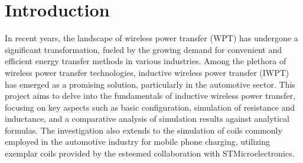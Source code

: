 \documentclass[11pt,a4paper,twoside,openany]{report}
\newcommand\declarationpage{}
\newcommand\acknowledgementspage{}
\newcommand\abstractpage{}
\begin{document}
    
    \begin{titlepage}
        
    \end{titlepage}

    \newpage\blankpage








    \tableofcontents

    \chapter*{Introduction}
    \label{chap:introduction}
    
    In recent years, the landscape of wireless power transfer (WPT) has undergone a significant transformation, fueled by the growing demand for convenient and efficient energy transfer methods in various industries. Among the plethora of wireless power transfer technologies, inductive wireless power transfer (IWPT) has emerged as a promising solution, particularly in the automotive sector. This project aims to delve into the fundamentals of inductive wireless power transfer, focusing on key aspects such as basic configuration, simulation of resistance and inductance, and a comparative analysis of simulation results against analytical formulas. The investigation also extends to the simulation of coils commonly employed in the automotive industry for mobile phone charging, utilizing exemplar coils provided by the esteemed collaboration with STMicroelectronics.
\end{document}
